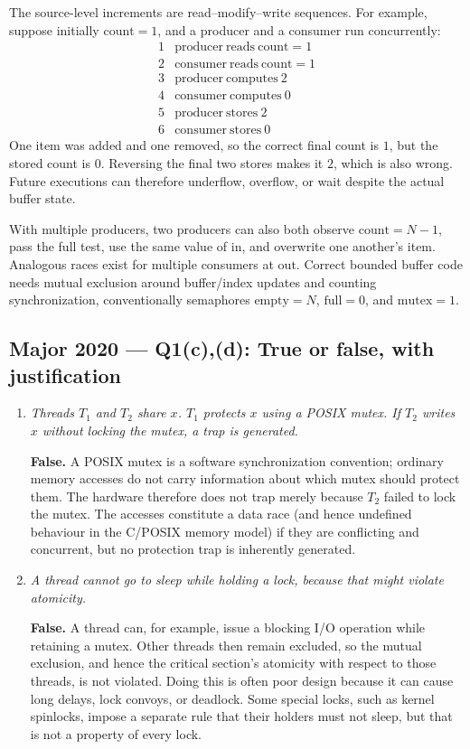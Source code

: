 \documentclass[11pt,a4paper]{article}
\begin{document}
The source-level increments are read--modify--write sequences.  For
example, suppose initially \(\mathrm{count}=1\), and a producer and a
consumer run concurrently:
\[
\begin{array}{c|l}
1&\mathrm{producer\ reads\ count}=1\\
2&\mathrm{consumer\ reads\ count}=1\\
3&\mathrm{producer\ computes}\ 2\\
4&\mathrm{consumer\ computes}\ 0\\
5&\mathrm{producer\ stores}\ 2\\
6&\mathrm{consumer\ stores}\ 0
\end{array}
\]
One item was added and one removed, so the correct final count is
\(1\), but the stored count is \(0\).  Reversing the final two stores
makes it \(2\), which is also wrong.  Future executions can therefore
underflow, overflow, or wait despite the actual buffer state.

With multiple producers, two producers can also both observe
\(\mathrm{count}=N-1\), pass the full test, use the same value of
\(\mathrm{in}\), and overwrite one another's item.  Analogous races
exist for multiple consumers at \(\mathrm{out}\).  Correct bounded
buffer code needs mutual exclusion around buffer/index updates and
counting synchronization, conventionally semaphores
\(\mathrm{empty}=N\), \(\mathrm{full}=0\), and
\(\mathrm{mutex}=1\).

\subsection*{Major 2020 --- Q1(c),(d): True or false, with justification}
\begin{enumerate}
\item[(c)] \emph{Threads \(T_1\) and \(T_2\) share \(x\).  \(T_1\) protects
\(x\) using a POSIX mutex.  If \(T_2\) writes \(x\) without locking the
mutex, a trap is generated.}

\textbf{False.}  A POSIX mutex is a software synchronization convention;
ordinary memory accesses do not carry information about which mutex should
protect them.  The hardware therefore does not trap merely because \(T_2\)
failed to lock the mutex.  The accesses constitute a data race (and hence
undefined behaviour in the C/POSIX memory model) if they are conflicting and
concurrent, but no protection trap is inherently generated.

\item[(d)] \emph{A thread cannot go to sleep while holding a lock, because
that might violate atomicity.}

\textbf{False.}  A thread can, for example, issue a blocking I/O operation
while retaining a mutex.  Other threads then remain excluded, so the mutual
exclusion, and hence the critical section's atomicity with respect to those
threads, is not violated.  Doing this is often poor design because it can
cause long delays, lock convoys, or deadlock.  Some special locks, such as
kernel spinlocks, impose a separate rule that their holders must not sleep,
but that is not a property of every lock.

\end{enumerate}
\end{document}
